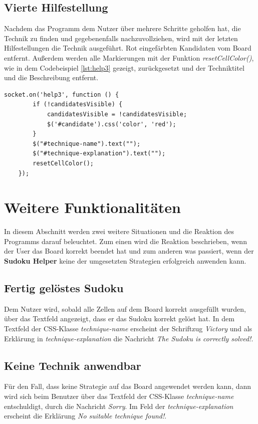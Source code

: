 \subsection{Vierte Hilfestellung}
Nachdem das Programm dem Nutzer über mehrere Schritte geholfen hat, die Technik zu finden und gegebenenfalls nachzuvollziehen, wird mit der letzten Hilfestellungen die Technik ausgeführt. Rot eingefärbten Kandidaten vom Board entfernt. Außerdem werden alle Markierungen mit der Funktion \textit{resetCellColor()}, wie in dem Codebeispiel \ref{lst:help3} gezeigt, zurückgesetzt und der Techniktitel und die Beschreibung entfernt. 

\newpage

\begin{lstlisting}[caption={Vierte Hilfestellung}, label={lst:help3}]
	socket.on('help3', function () {
		if (!candidatesVisible) {
			candidatesVisible = !candidatesVisible;
			$('#candidate').css('color', 'red');
		}
		$("#technique-name").text("");
		$("#technique-explanation").text("");
		resetCellColor();
	});

\end{lstlisting}

\section{Weitere Funktionalitäten}
In diesem Abschnitt werden zwei weitere Situationen und die Reaktion des Programms darauf beleuchtet. Zum einen wird die Reaktion beschrieben, wenn der User das Board korrekt beendet hat und zum anderen was passiert, wenn der \textbf{Sudoku Helper} keine der umgesetzten Strategien erfolgreich anwenden kann.

\subsection{Fertig gelöstes Sudoku}
Dem Nutzer wird, sobald alle Zellen auf dem Board korrekt ausgefüllt wurden, über das Textfeld angezeigt, dass er das Sudoku korrekt gelöst hat. In dem Textfeld der CSS-Klasse \textit{technique-name} erscheint der Schriftzug \textit{Victory} und als Erklärung in \textit{technique-explanation} die Nachricht \textit{The Sudoku is correctly solved!}. 

\subsection{Keine Technik anwendbar}
Für den Fall, dass keine Strategie auf das Board angewendet werden kann, dann wird sich beim Benutzer über das Textfeld der CSS-Klasse \textit{technique-name} entschuldigt, durch die Nachricht \textit{Sorry}. Im Feld der \textit{technique-explanation} erscheint die Erklärung \textit{No suitable technique found!}.
